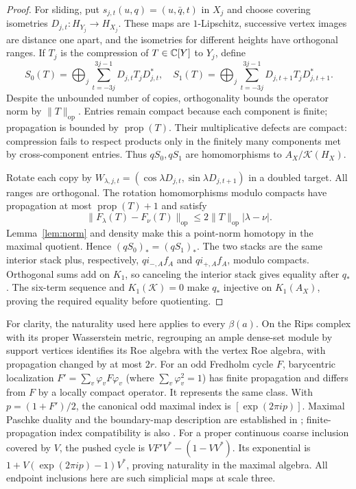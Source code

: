 \documentclass[11pt]{article}
\theoremstyle{remark}\newtheorem{remark}[theorem]{Remark}
\newcommand{\prop}{\operatorname{prop}}\newcommand{\Ad}{\operatorname{Ad}}
\begin{document}
\begin{proof}
For sliding, put $s_{j,t}(u,q)=(u,\bar q,t)$ in $X_j$ and choose covering
isometries $D_{j,t}:H_{Y_j}\to H_{X_j}$. These maps are $1$-Lipschitz,
successive vertex images are distance one apart, and the isometries for
different heights have orthogonal ranges. If $T_j$ is the compression of
$T\in\mathbb C[Y]$ to $Y_j$, define
\[
 S_0(T)=\bigoplus_j\sum_{t=-3j}^{3j-1}D_{j,t}T_jD_{j,t}^*,\quad
 S_1(T)=\bigoplus_j\sum_{t=-3j}^{3j-1}D_{j,t+1}T_jD_{j,t+1}^*.
\]
Despite the unbounded number of copies, orthogonality bounds the operator
norm by $\|T\|_{\mathrm{op}}$. Entries remain compact because each
component is finite; propagation is bounded by $\prop(T)$.
Their multiplicative defects are compact: compression fails to respect
products only in the finitely many components met by cross-component
entries. Thus $qS_0,qS_1$ are homomorphisms to
$A_X/\mathcal K(H_X)$.

Rotate each copy by
$W_{\lambda,j,t}=(\cos\lambda D_{j,t},\sin\lambda D_{j,t+1})$ in a doubled
target. All ranges are orthogonal. The rotation homomorphisms modulo
compacts have propagation at most $\prop(T)+1$ and satisfy
\[
 \|F_\lambda(T)-F_\nu(T)\|_{\mathrm{op}}
 \leq2\|T\|_{\mathrm{op}}|\lambda-\nu|.
\]
Lemma~\ref{lem:norm} and density make this a point-norm homotopy in the
maximal quotient. Hence $(qS_0)_*=(qS_1)_*$.
The two stacks are the same interior stack plus, respectively,
$q i_{-,A}f_A$ and $q i_{+,A}f_A$, modulo compacts. Orthogonal sums add
on $K_1$, so canceling the interior stack gives equality after $q_*$.
The six-term sequence and $K_1(\mathcal K)=0$ make $q_*$ injective on
$K_1(A_X)$, proving the required equality before quotienting.
\end{proof}

For clarity, the naturality used here applies to every $\beta(a)$.
On the Rips complex with its proper Wasserstein metric, regrouping an ample
dense-set module by support vertices identifies its Roe algebra with the
vertex Roe algebra, with propagation changed by at most $2r$.
For an odd Fredholm cycle $F$, barycentric localization
$F'=\sum_v\varphi_v F\varphi_v$ (where $\sum_v\varphi_v^2=1$) has finite
propagation and differs from $F$ by a locally compact operator.
It represents the same class. With $p=(1+F')/2$, the canonical odd maximal
index is $[\exp(2\pi i p)]$. Maximal Paschke duality and the boundary-map
description are established in \cite[Propositions 2.22, 2.27--2.28 and
Corollary 2.29]{SS}; finite-propagation index compatibility is also
\cite[Corollary 2.18]{OOY}.
For a proper continuous coarse inclusion covered by $V$, the pushed cycle
is $VF'V^*-(1-VV^*)$. Its exponential is
$1+V(\exp(2\pi i p)-1)V^*$, proving naturality in the maximal algebra.
All endpoint inclusions here are such simplicial maps at scale three.
\end{document}
